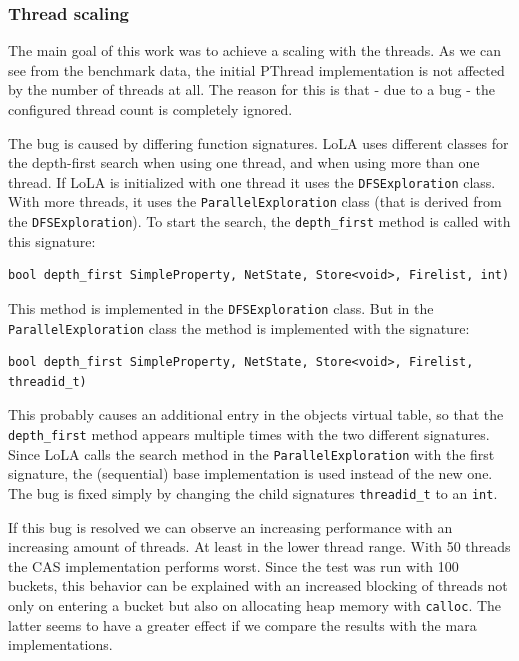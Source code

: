 \subsubsection{Thread scaling}
The main goal of this work was to achieve a scaling with the threads. As we can see from the benchmark data, the initial PThread implementation is not affected by the number of threads at all. The reason for this is that - due to a bug - the configured thread count is completely ignored. 

The bug is caused by differing function signatures. LoLA uses different classes for the depth-first search when using one thread, and when using more than one thread. If LoLA is initialized with one thread it uses the \texttt{DFSExploration} class. With more threads, it uses the \texttt{ParallelExploration} class (that is derived from the \texttt{DFSExploration}). To start the search, the \texttt{depth\_first} method is called with this signature:
\begin{lstlisting}
bool depth_first SimpleProperty, NetState, Store<void>, Firelist, int)
\end{lstlisting}
This method is implemented in the \texttt{DFSExploration} class. But in the \texttt{Parallel\-Exploration} class the method is implemented with the signature: 
\begin{lstlisting}
bool depth_first SimpleProperty, NetState, Store<void>, Firelist, threadid_t)
\end{lstlisting}
 This probably causes an additional entry in the objects virtual table, so that the \texttt{depth\_first} method appears multiple times with the two different signatures. Since LoLA calls the search method in the \texttt{ParallelExploration} with the first signature, the (sequential) base implementation is used instead of the new one. The bug is fixed simply by changing the child signatures \texttt{threadid\_t} to an \texttt{int}.

If this bug is resolved we can observe an increasing performance with an increasing amount of threads. At least in the lower thread range. With 50 threads the CAS implementation performs worst. Since the test was run with 100 buckets, this behavior can be explained with an increased blocking of threads not only on entering a bucket but also on allocating heap memory with \texttt{calloc}. The latter seems to have a greater effect if we compare the results with the mara implementations.

